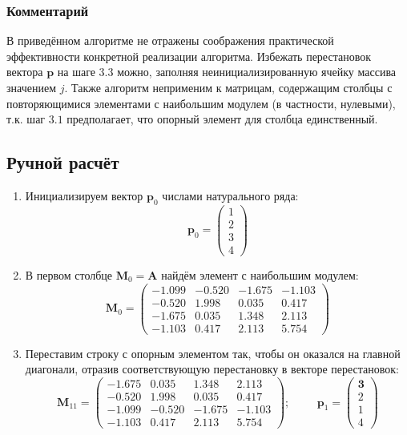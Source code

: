 \subsubsection{Комментарий}
В приведённом алгоритме не отражены соображения практической эффективности конкретной реализации алгоритма. Избежать перестановок вектора $\mathbf{p}$ на шаге $3.3$ можно, заполняя неинициализированную ячейку массива значением $j$. Также алгоритм неприменим к матрицам, содержащим столбцы с повторяющимися элементами с наибольшим модулем (в частности, нулевыми), т.к. шаг $3.1$ предполагает, что опорный элемент для столбца единственный.

\subsection{Ручной расчёт}
\begin{enumerate}
    \item Инициализируем вектор $\mathbf{p}_0$ числами натурального ряда:
    \[\mathbf{p}_0 = \begin{pmatrix} 1 \\ 2 \\ 3 \\ 4 \end{pmatrix}\]

    \item В первом столбце $\mathbf{M}_0 = \mathbf{A}$ найдём элемент с наибольшим модулем:
    \[\mathbf{M}_0 =
    \begin{pmatrix}
        -1.099& -0.520& -1.675& -1.103\\
        -0.520&  1.998&  0.035&  0.417\\
       \mathbf{-1.675}&  0.035&  1.348&  2.113\\
        -1.103&  0.417&  2.113&  5.754
    \end{pmatrix}\]

    \item Переставим строку с опорным элементом так, чтобы он оказался на главной диагонали, отразив соответствующую перестановку в векторе перестановок:
    \[\mathbf{M}_{11} =
    \begin{pmatrix}
        \mathbf{-1.675}& \mathbf{ 0.035}& \mathbf{ 1.348}& \mathbf{ 2.113}\\
        -0.520&  1.998&  0.035&  0.417\\
        \mathit{-1.099}& \mathit{-0.520}& \mathit{-1.675}& \mathit{-1.103}\\
        -1.103&  0.417&  2.113&  5.754
    \end{pmatrix}; \hspace{1cm}
    \mathbf{p}_1 = \begin{pmatrix} \mathbf{3} \\ 2 \\ \mathit{1} \\ 4 \end{pmatrix}\]


\end{enumerate}
